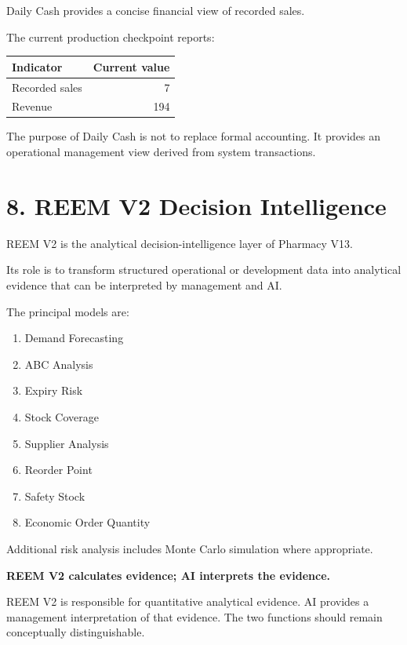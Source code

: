 \documentclass[12pt,a4paper]{article}
\begin{document}
Daily Cash provides a concise financial view of recorded sales.

The current production checkpoint reports:

\begin{center}
\begin{tabular}{lr}
\toprule
\textbf{Indicator} & \textbf{Current value}\\
\midrule
Recorded sales & 7\\
Revenue & 194\\
\bottomrule
\end{tabular}
\end{center}

The purpose of Daily Cash is not to replace formal accounting. It provides an operational management view derived from system transactions.

\section*{8. REEM V2 Decision Intelligence}

REEM V2 is the analytical decision-intelligence layer of Pharmacy V13.

Its role is to transform structured operational or development data into analytical evidence that can be interpreted by management and AI.

The principal models are:

\begin{enumerate}[leftmargin=1cm]
\item Demand Forecasting
\item ABC Analysis
\item Expiry Risk
\item Stock Coverage
\item Supplier Analysis
\item Reorder Point
\item Safety Stock
\item Economic Order Quantity
\end{enumerate}

Additional risk analysis includes Monte Carlo simulation where appropriate.

\begin{keybox}
\textbf{REEM V2 calculates evidence; AI interprets the evidence.}

REEM V2 is responsible for quantitative analytical evidence. AI provides a management interpretation of that evidence. The two functions should remain conceptually distinguishable.
\end{keybox}
\end{document}
